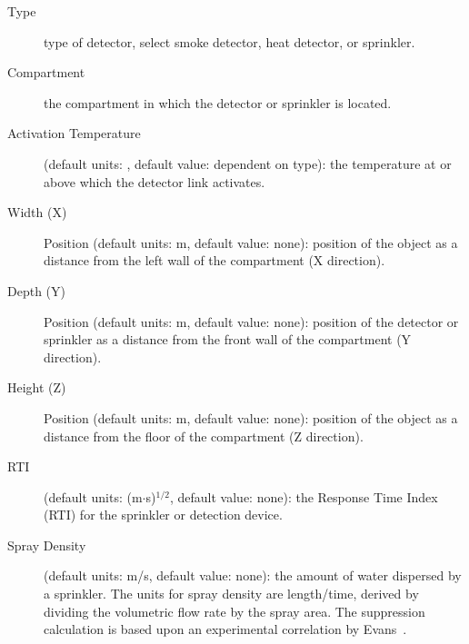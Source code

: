 \begin{description}
\item[Type] type of detector, select smoke detector, heat detector, or sprinkler.

\item[Compartment] the compartment in which the detector or sprinkler is located.

\item[Activation Temperature] (default units: \degc, default value: dependent on type): the temperature at or above which the detector link activates.

\item[Width (X)] Position (default units: m, default value: none): position of the object as a distance from the left wall of the compartment (X direction).

\item[Depth (Y)] Position (default units: m, default value: none): position of the detector or sprinkler as a distance from the front wall of the compartment (Y direction).

\item[Height (Z)] Position (default units: m, default value: none): position of the object as a distance from the floor of the compartment (Z direction).

\item[RTI] (default units: (m$\cdot$s)$^{1/2}$, default value: none): the Response Time Index (RTI) for the sprinkler or detection device.

\item[Spray Density] (default units: m/s, default value: none): the amount of water dispersed by a sprinkler.  The units for spray density are length/time, derived by dividing the volumetric flow rate by the spray area. The suppression calculation is based upon an experimental correlation by Evans~\cite{Evans:1993}.
\end{description}

